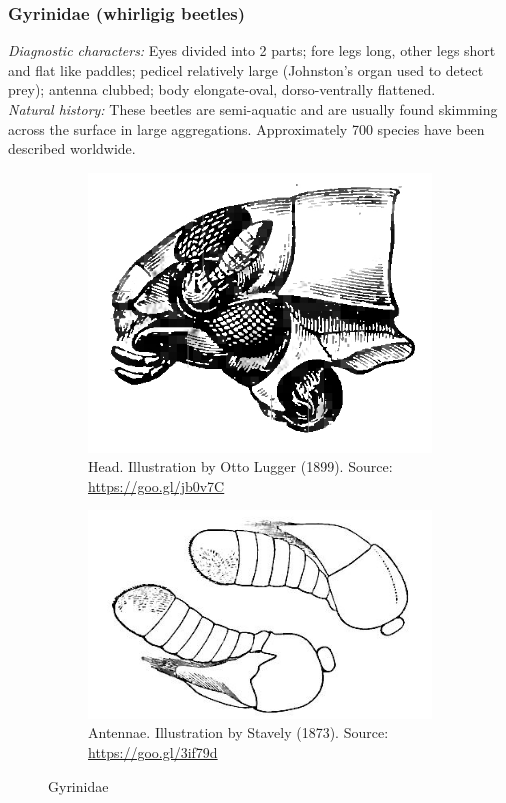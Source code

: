 \documentclass[letterpaper, 11pt]{article}
\begin{document}
\subsubsection{Gyrinidae (whirligig beetles)}
\noindent{}\textit{Diagnostic characters:} Eyes divided into 2 parts; fore legs long, other legs short and flat like paddles; pedicel relatively large (Johnston's organ used to detect prey); antenna clubbed; body elongate-oval, dorso-ventrally flattened. \\

\noindent{}\textit{Natural history:} These beetles are semi-aquatic and are usually found skimming across the surface in large aggregations. Approximately 700 species have been described worldwide.

\begin{figure}[ht!]
  \centering
\begin{subfigure}[ht!]{0.35\textwidth}
    \includegraphics[width=\textwidth]{GyrinidHead}
  \caption{Head. Illustration by Otto Lugger (1899). Source: \url{https://goo.gl/jb0v7C}}
  \label{fig:gyrinidhead}
\end{subfigure}
    \qquad
\begin{subfigure}[ht!]{0.4\textwidth}
    \includegraphics[width=\textwidth]{GyrinidAntennae}
  \caption{Antennae. Illustration by Stavely (1873). Source: \url{https://goo.gl/3if79d}}
  \label{fig:gyrinidantenna}
\end{subfigure}
    \caption{Gyrinidae}\label{fig:gyrinids}
\end{figure}
\end{document}
